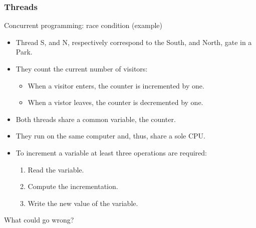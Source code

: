   \begin{frame}
    \frametitle{Threads}
        \begin{block}{Concurrent programming: race condition (example)}
          \begin{itemize}
            \item Thread S, and N, respectively correspond to the South, and North, gate in a Park. 
            \item They count the current number of visitors:
            \begin{itemize}
              \item When a visitor enters, the counter is incremented by one. 
              \item When a vistor leaves, the counter is decremented by one.
            \end{itemize}
            \item Both threads share a common variable, the counter.
            \item They run on the same computer and, thus, share a sole CPU.
            \item To increment a variable at least three operations are required:
            \begin{enumerate}
              \item Read the variable.
              \item Compute the incrementation.
              \item Write the new value of the variable.
            \end{enumerate}
          \end{itemize}
        \end{block}
	What could go wrong?
  \end{frame}
